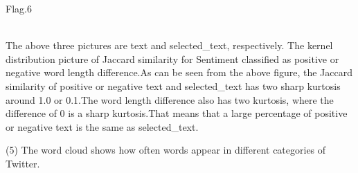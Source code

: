 \begin{center}
\begin{minipage}{0.4\linewidth}
      {\small{Flag.6}}
    
      \end{minipage}
  \hfill
  ~\\
  The above three pictures are text and selected_text, respectively. The 
  kernel distribution picture of Jaccard similarity for Sentiment 
  classified as positive or negative word length difference.As can be 
  seen from the above figure, the Jaccard similarity of positive or 
  negative text and selected_text has two sharp kurtosis around 1.0 or
   0.1.The word length difference also has two kurtosis, where the 
   difference of 0 is a sharp kurtosis.That means that a large 
   percentage of positive or negative text is the same as selected_text.
\end{center}
(5)
The word cloud shows how often words appear in different categories of Twitter.
